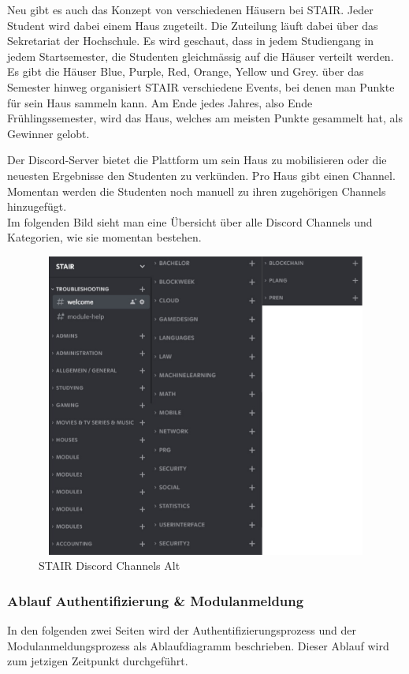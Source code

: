 \documentclass[a4paper, table]{article}
\begin{document}
Neu gibt es auch das Konzept von verschiedenen H\"ausern bei STAIR. Jeder Student wird dabei einem Haus zugeteilt. Die Zuteilung l\"auft
dabei \"uber das Sekretariat der Hochschule. Es wird geschaut, dass in jedem Studiengang in jedem Startsemester, die Studenten gleichm\"assig
auf die H\"auser verteilt werden.
Es gibt die H\"auser Blue, Purple, Red, Orange, Yellow und Grey. \"uber das Semester hinweg organisiert STAIR verschiedene Events, bei denen
man Punkte f\"ur sein Haus sammeln kann. Am Ende jedes Jahres, also Ende Fr\"uhlingssemester, wird das Haus, welches am meisten Punkte
gesammelt hat, als Gewinner gelobt.

Der Discord-Server bietet die Plattform um sein Haus zu mobilisieren oder die neuesten Ergebnisse den Studenten zu verk\"unden.
Pro Haus gibt einen Channel. Momentan werden die Studenten noch manuell zu ihren zugeh\"origen Channels hinzugef\"ugt. \\
Im folgenden Bild sieht man eine Übersicht über alle Discord Channels und Kategorien, wie sie momentan bestehen.

\begin{figure}[h]
    \centering
    \includegraphics[width=1.0\textwidth,height=10cm]{img/Stair_Discord_Channels.jpg}
    \caption{STAIR Discord Channels Alt}
    \label{fig:stair_old_discord_channels}
\end{figure}

\subsubsection*{Ablauf Authentifizierung \& Modulanmeldung}
In den folgenden zwei Seiten wird der Authentifizierungsprozess und der Modulanmeldungsprozess als Ablaufdiagramm beschrieben.
Dieser Ablauf wird zum jetzigen Zeitpunkt durchgeführt.
\end{document}
